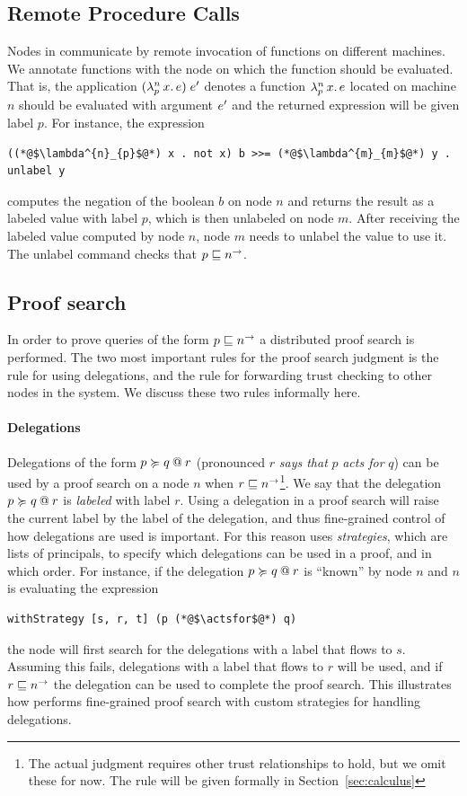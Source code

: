 \subsection{Remote Procedure Calls}
Nodes in \lang{} communicate by remote invocation of functions on different machines. We annotate functions with the node on which the function should be evaluated. That is, the application $\app{(\abs{n}{p}{x}{\expr})}{\expr'}$ denotes a function $\abs{n}{p}{x}{\expr}$ located on machine $n$ should be evaluated with argument $\expr'$ and the returned expression will be given label $p$. For instance, the expression
\begin{lstlisting}
((*@$\lambda^{n}_{p}$@*) x . not x) b >>= (*@$\lambda^{m}_{m}$@*) y . unlabel y
\end{lstlisting}
computes the negation of the boolean $b$ on node $n$ and returns the result as a labeled value with label $p$, which is then unlabeled on node $m$. After receiving the labeled value computed by node $n$, node $m$ needs to unlabel the value to use it. The unlabel command checks that $p \flowsto \conf{n}$.

\subsection{Proof search}
In order to prove queries of the form $p \flowsto \conf{n}$ a distributed proof search is performed. The two most important rules for the proof search judgment is the rule for using delegations, and the rule for forwarding trust checking to other nodes in the system. We discuss these two rules informally here.

\paragraph{Delegations}
Delegations of the form $\lb{r}{p \actsfor q}$ (pronounced $r$ \emph{says that} $p$ \emph{acts for} $q$) can be used by a proof search on a node $n$ when $r \flowsto \conf{n}$\footnote{The actual judgment requires other trust relationships to hold, but we omit these for now. The rule will be given formally in Section~\ref{sec:calculus}}. We say that the delegation $\lb{r}{p \actsfor q}$ is \emph{labeled} with label $r$. Using a delegation in a proof search will raise the current label by the label of the delegation, and thus fine-grained control of how delegations are used is important. For this reason \lang{} uses \emph{strategies}, which are lists of principals, to specify which delegations can be used in a proof, and in which order. For instance, if the delegation $\lb{r}{p \actsfor q}$ is ``known'' by node $n$ and $n$ is evaluating the expression
\begin{lstlisting}
withStrategy [s, r, t] (p (*@$\actsfor$@*) q)
\end{lstlisting}
the node will first search for the delegations with a label that flows to $s$. Assuming this fails, delegations with a label that flows to $r$ will be used, and if $r \flowsto \conf{n}$ the delegation can be used to complete the proof search. This illustrates how \lang{} performs fine-grained proof search with custom strategies for handling delegations.

